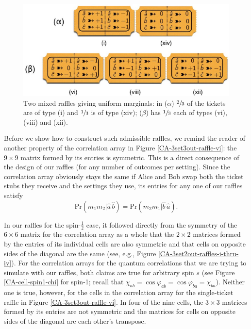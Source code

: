 \begin{figure}[ht]
 \centering
   \includegraphics[width=4.5in]{admissible-raffles-spin1.jpeg} 
   \caption{Two mixed raffles giving uniform marginals: in ($\alpha$) $\sfrac23$ of the tickets are of type (i) and $\sfrac13$ is of type (xiv); ($\beta$) has $\sfrac13$ each of types (vi), (viii) and (xii).}
   \label{admissible-raffles-spin1}
\end{figure}

Before we show how to construct such admissible raffles, we remind the reader of another property of the correlation array in Figure \ref{CA-3set3out-raffle-vi}: the $9 \times 9$ matrix formed by its entries is symmetric. This is a direct consequence of the design of our raffles (for any number of outcomes per setting). Since the correlation array obviously stays the same if Alice and Bob swap both the ticket stubs they receive and the settings they use, its entries for any one of our raffles satisfy  
\begin{equation}
\mathrm{Pr}\!\left(m_1 m_2 \big| \hat{a} \,\hat{b}\right)
=  \mathrm{Pr}\!\left(m_2 m_1 \big| \hat{b} \,\hat{a}\right).
\label{swap symmetry}
\end{equation}

In our raffles for the spin-$\frac12$ case, it followed directly from the symmetry of the $6 \times 6$ matrix for the correlation array as a whole that the $2 \times 2$ matrices formed by the entries of its individual cells are also symmetric and that cells on opposite sides of the diagonal are the same (see, e.g., Figure \ref{CA-3set2out-raffles-i-thru-iv}). For the correlation arrays for the quantum correlations that we are trying to simulate with our raffles, both claims are true for arbitrary spin $s$ (see Figure \ref{CA-cell-spin1-chi} for spin-1; recall that $\chi_{ab} = \cos{\varphi_{ab}} = \cos{\varphi_{ba}} = \chi_{ba}$). Neither one is true, however, for the cells in the correlation array for the single-ticket raffle in Figure \ref{CA-3set3out-raffle-vi}.  In four of the nine cells, the $3 \times 3$ matrices formed by its entries are not symmetric and the matrices for cells on opposite sides of the diagonal are each other's transpose. 

